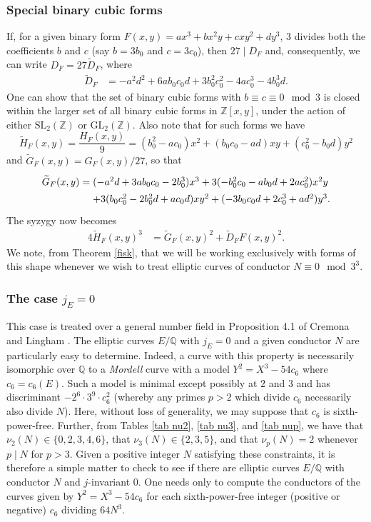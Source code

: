 \subsubsection{Special binary cubic forms} \label{dahlia}
If, for a given binary form $F(x,y)=a x^3 + b x^2 y + c xy^2 + d y^3$, 3 divides both the coefficients $b$ and $c$ (say $b = 3 b_0$ and 
$c=3 c_0$), then  $27 \mid D_F$ and, consequently, we can write $D_F=27 \widetilde{D}_F$, where
\begin{align*}
\widetilde{D}_F &= -a^2d^2+6ab_0c_0d+3b_0^2c_0^2-4ac_0^3-4b_0^3d.
\end{align*}
One can show that the set of binary cubic forms with $b \equiv c \equiv 0 \mod{3}$ is closed within the larger set of all binary 
cubic forms in $\mathbb{Z}[x,y]$, under the action of either $\mbox{SL}_2 ( \mathbb{Z})$ or $\mbox{GL}_2 ( \mathbb{Z})$. 
Also note that for such forms we have
$$
 \widetilde{H}_F(x,y) = \frac{H_F(x,y)}{9}= (b_0^2-ac_0) x^2 + (b_0c_0-ad) xy + (c_0^2-b_0d) y^2 
$$
and $\widetilde{G}_F (x,y) =  G_F(x,y)/27$, so that
$$
\arraycolsep=1.4pt\def\arraystretch{1.4}
\begin{array}{cl} 
\widetilde{G}_F (x,y) = & (-a^2d+3ab_0c_0-2b_0^3) x^3 + 3 (-b_0^2c_0-ab_0d+2ac_0^2) x^2 y \\
 & + 3 (b_0c_0^2-2b_0^2d+ac_0d) x y^2 + (-3b_0c_0d+2c_0^3+ad^2) y^3. \\
 \end{array}
$$
The syzygy now becomes
\begin{align} \label{syz2}
4\widetilde{H}_F (x,y)^3 &=\widetilde{G}_F(x,y)^2+\widetilde{D}_F F(x,y)^2.
\end{align}
We note, from Theorem \ref{fisk}, that we will be working exclusively with forms of this shape whenever we wish to treat elliptic curves of conductor $N \equiv 0 \mod{3^3}$.

\subsubsection{The case $j_E = 0$} \label{Mordell}
This case is treated over a general number field in Proposition 4.1 of Cremona and Lingham \cite{CrLi}.
The elliptic curves $E/\mathbb{Q}$ with $j_E=0$ and a given conductor $N$ are particularly easy to determine. Indeed, a curve with this property is necessarily isomorphic over $\mathbb{Q}$ to a {\it Mordell} curve with a model $Y^2 = X^3  - 54 c_6$ where $c_6=c_6(E)$. Such a model is minimal except possibly at $2$ and $3$ and has discriminant 
$-2^6 \cdot 3^9 \cdot c_6^2$ (whereby any primes $p > 2$ which divide $c_6$  necessarily also divide $N$). Here, without loss of generality, we may suppose that $c_6$ is sixth-power-free.
Further, from Tables \ref{tab nu2}, \ref{tab nu3}, and \ref{tab nup}, we have that $\nu_2(N) \in \{ 0, 2, 3, 4, 6 \}$, that $\nu_3 (N) \in \{ 2, 3, 5 \}$, and that $\nu_p(N)=2$ whenever $p \mid N$ for $p > 3$. Given a positive integer $N$ satisfying these constraints, it is therefore a simple matter to check to see if there are elliptic curves $E/\mathbb{Q}$ with conductor $N$ and $j$-invariant $0$. One needs only to compute the conductors of the curves given by $Y^2 = X^3  - 54 c_6$ for each sixth-power-free integer (positive or negative) $c_6$ dividing $64 N^3$.


